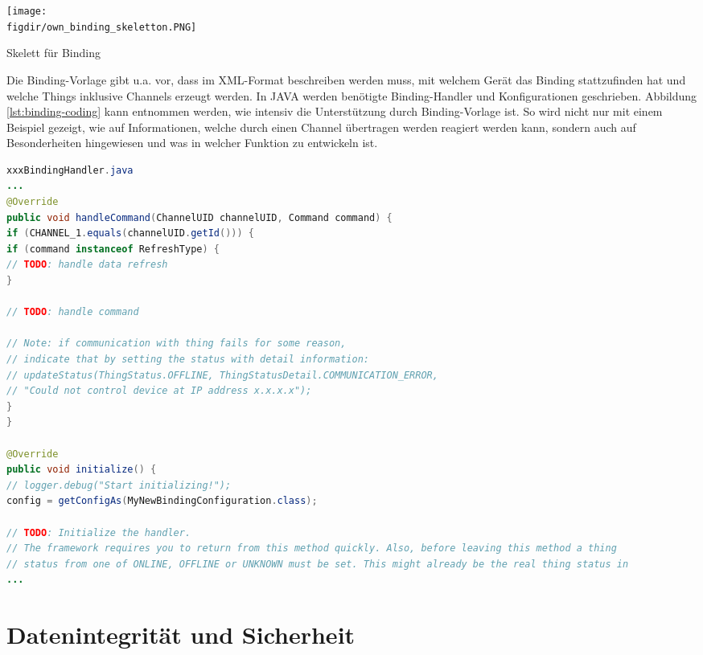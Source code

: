 {
	\centering
	\captionsetup{type=figure}
	\texttt{[image: \\figdir/own\_binding\_skeletton.PNG]}
	\caption{Skelett für Binding \label{fig:own_binding_skeleton}}
}

Die Binding-Vorlage gibt u.a. vor, dass im XML-Format beschreiben werden muss, mit welchem Gerät das Binding stattzufinden hat und welche Things inklusive Channels erzeugt werden. In JAVA werden benötigte Binding-Handler und Konfigurationen geschrieben. Abbildung \ref{lst:binding-coding} kann entnommen werden, wie intensiv die Unterstützung durch Binding-Vorlage ist. So wird nicht nur mit einem Beispiel gezeigt, wie auf Informationen, welche durch einen Channel übertragen werden reagiert werden kann, sondern auch auf Besonderheiten hingewiesen und was in welcher Funktion zu entwickeln ist. 


\begin{lstlisting}[language=java,firstnumber=1,caption=Handler.java Ausschnitt,label=lst:binding-coding]
xxxBindingHandler.java
...
@Override
public void handleCommand(ChannelUID channelUID, Command command) {
if (CHANNEL_1.equals(channelUID.getId())) {
if (command instanceof RefreshType) {
// TODO: handle data refresh
}

// TODO: handle command

// Note: if communication with thing fails for some reason,
// indicate that by setting the status with detail information:
// updateStatus(ThingStatus.OFFLINE, ThingStatusDetail.COMMUNICATION_ERROR,
// "Could not control device at IP address x.x.x.x");
}
}

@Override
public void initialize() {
// logger.debug("Start initializing!");
config = getConfigAs(MyNewBindingConfiguration.class);

// TODO: Initialize the handler.
// The framework requires you to return from this method quickly. Also, before leaving this method a thing
// status from one of ONLINE, OFFLINE or UNKNOWN must be set. This might already be the real thing status in
...
\end{lstlisting}


\section{Datenintegrität und Sicherheit}


